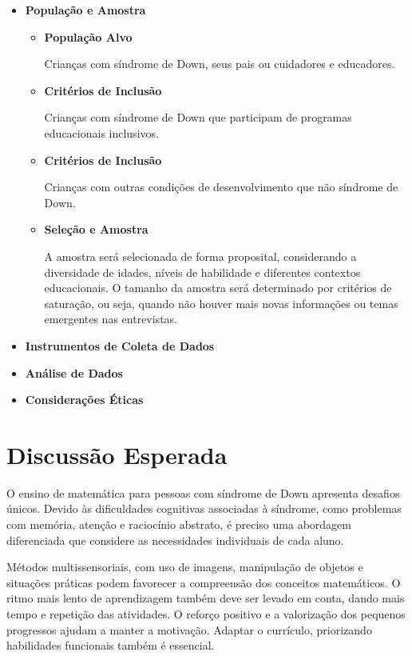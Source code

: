\begin{itemize}
    \item \textbf{População e Amostra}
    
    \begin{itemize}
    
        \item \textbf{População Alvo}
    
        Crianças com síndrome de Down, seus pais ou cuidadores e educadores.

        \item \textbf{Critérios de Inclusão}

        Crianças com síndrome de Down que participam de programas educacionais inclusivos.

        \item \textbf{Critérios de Inclusão}

        Crianças com outras condições de desenvolvimento que não síndrome de Down.

        \item \textbf{Seleção e Amostra}

    A amostra será selecionada de forma proposital, considerando a diversidade de idades, níveis de habilidade e diferentes contextos educacionais. O tamanho da amostra será determinado por critérios de saturação, ou seja, quando não houver mais novas informações ou temas emergentes nas entrevistas.
    \end{itemize}
    \item \textbf{Instrumentos de Coleta de Dados}

    \item \textbf{Análise de Dados}

    \item \textbf{Considerações Éticas}
    
\end{itemize}

\section{Discussão Esperada}

O ensino de matemática para pessoas com síndrome de Down apresenta desafios únicos. Devido às dificuldades cognitivas associadas à síndrome, como problemas com memória, atenção e raciocínio abstrato, é preciso uma abordagem diferenciada que considere as necessidades individuais de cada aluno.

Métodos multissensoriais, com uso de imagens, manipulação de objetos e situações práticas podem favorecer a compreensão dos conceitos matemáticos. O ritmo mais lento de aprendizagem também deve ser levado em conta, dando mais tempo e repetição das atividades. O reforço positivo e a valorização dos pequenos progressos ajudam a manter a motivação. Adaptar o currículo, priorizando habilidades funcionais também é essencial. 

